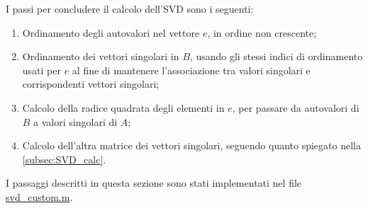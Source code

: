 I passi per concludere il calcolo dell'SVD sono i seguenti:
\begin{enumerate}
	\item Ordinamento degli autovalori nel vettore $e$, in ordine non crescente;
	\item Ordinamento dei vettori singolari in $B$, usando gli stessi indici di 
ordinamento usati per $e$ al fine di mantenere l'associazione tra valori 
singolari e corrispondenti vettori singolari;
	\item Calcolo della radice quadrata degli elementi in $e$, per passare da 
autovalori di $B$ a valori singolari di $A$;
	\item Calcolo dell'altra matrice dei vettori singolari, seguendo quanto 
spiegato nella \autoref{subsec:SVD_calc}.
\end{enumerate}

\noindent
I passaggi descritti in questa sezione sono stati implementati nel file 
\href{https://github.com/Yagotzirck/svd_benchmark/blob/main/src/svd_custom.m}{svd\_custom.m}.